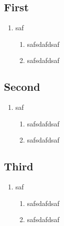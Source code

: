 \documentclass{book}
\begin{document}
\begin{english}
\chapter{First}
\begin{enumerate}
  \item saf
  \begin{enumerate}
    \item safsdafdsaf
    \item safsdafdsaf
  \end{enumerate}
\end{enumerate}
\end{english}

\begin{greek}
\chapter{Second}
\begin{enumerate}
  \item saf
  \begin{enumerate}
    \item safsdafdsaf
    \item safsdafdsaf
  \end{enumerate}
\end{enumerate}
\end{greek}

\begin{english}
\chapter{Third}
\begin{enumerate}
  \item saf
  \begin{enumerate}
    \item safsdafdsaf
    \item safsdafdsaf
  \end{enumerate}
\end{enumerate}
\end{english}
\end{document}
